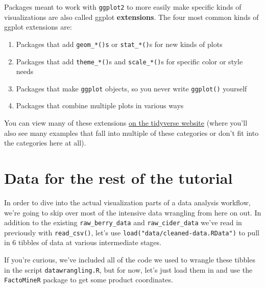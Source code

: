 \documentclass[
]{book}
\providecommand{\tightlist}{%
  \setlength{\itemsep}{0pt}\setlength{\parskip}{0pt}}
\begin{document}
Packages meant to work with \texttt{ggplot2} to more easily make specific kinds of visualizations are also called ggplot \textbf{extensions}. The four most common kinds of ggplot extensions are:

\begin{enumerate}
\def\labelenumi{\arabic{enumi}.}
\tightlist
\item
  Packages that add \texttt{geom\_*()s} or \texttt{stat\_*()}s for new kinds of plots
\item
  Packages that add \texttt{theme\_*()}s and \texttt{scale\_*()}s for specific color or style needs
\item
  Packages that make \texttt{ggplot} objects, so you never write \texttt{ggplot()} yourself
\item
  Packages that combine multiple plots in various ways
\end{enumerate}

You can view many of these extensions \href{https://exts.ggplot2.tidyverse.org/gallery/}{on the tidyverse website} (where you'll also see many examples that fall into multiple of these categories or don't fit into the categories here at all).

\hypertarget{data-for-the-rest-of-the-tutorial}{%
\section{Data for the rest of the tutorial}\label{data-for-the-rest-of-the-tutorial}}

In order to dive into the actual visualization parts of a data analysis workflow, we're going to skip over most of the intensive data wrangling from here on out. In addition to the existing \texttt{raw\_berry\_data} and \texttt{raw\_cider\_data} we've read in previously with \texttt{read\_csv()}, let's use \texttt{load("data/cleaned-data.RData")} to pull in 6 tibbles of data at various intermediate stages.

If you're curious, we've included all of the code we used to wrangle these tibbles in the script \texttt{datawrangling.R}, but for now, let's just load them in and use the \texttt{FactoMineR} package to get some product coordinates.
\end{document}
